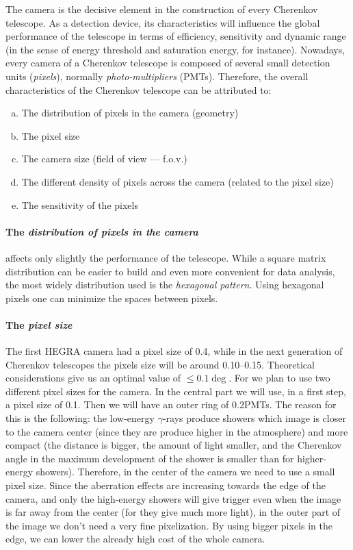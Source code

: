 The camera is the decisive element in the construction of every
Cherenkov telescope. As a detection device, its characteristics will
influence the global performance of the telescope in terms of
efficiency, sensitivity and dynamic range (in the sense of energy
threshold and saturation energy, for instance). Nowadays, every camera
of a Cherenkov telescope is composed of several small detection units
(\emph{pixels}), normally \emph{photo-multipliers} (PMTs).  Therefore,
the overall characteristics of the Cherenkov telescope can be
attributed to:
% 
\begin{enumerate}[a.]
\item The distribution of pixels in the camera (geometry)
\item The pixel size
\item The camera size (field of view --- f.o.v.)
\item The different density  of pixels across  the camera  (related to
  the pixel size)
\item The sensitivity of the pixels
\end{enumerate}

\paragraph{The \emph{distribution of pixels in the camera}} affects only
slightly the performance of the telescope.  While a square matrix
distribution can be easier to build and even more convenient for data
analysis, the most widely distribution used is the \emph{hexagonal
  pattern}. Using hexagonal pixels one can minimize the spaces between
pixels.

\paragraph{The \emph{pixel size}} The first HEGRA camera had a pixel 
size of 0.4\deg, while in the next generation of Cherenkov telescopes
the pixels size will be around 0.10\deg--0.15\deg.  Theoretical
considerations give us an optimal value of $\leq 0.1\deg$. For \MAGIC
we plan to use two different pixel sizes for the camera. In the
central part we will use, in a first step, a pixel size of 0.1\deg.
Then we will have an outer ring of 0.2\deg PMTs. The reason for this
is the following: the low-energy $\gamma$-rays produce showers which
image is closer to the camera center (since they are produce higher in
the atmosphere) and more compact (the distance is bigger, the amount
of light smaller, and the Cherenkov angle in the maximum development
of the shower is smaller than for higher-energy showers). Therefore,
in the center of the camera we need to use a small pixel size. Since
the aberration effects are increasing towards the edge of the camera,
and only the high-energy showers will give trigger even when the image
is far away from the center (for they give much more light), in the
outer part of the image we don't need a very fine pixelization. By
using bigger pixels in the edge, we can lower the already high cost of
the whole camera.

